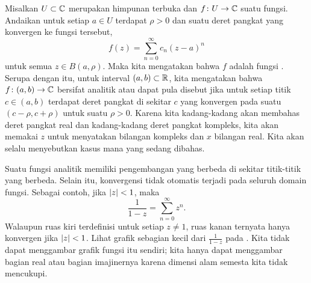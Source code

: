 Misalkan $U \subset {\mathbb{C}}$ merupakan himpunan terbuka dan
$f \colon U \to {\mathbb{C}}$ suatu fungsi.
Andaikan untuk setiap $a \in U$ terdapat $\rho > 0$ dan suatu deret
pangkat yang konvergen ke fungsi tersebut,
\begin{equation*}
f(z) = \sum_{n=0}^\infty c_n {(z-a)}^n
\end{equation*}
untuk semua $z \in B(a,\rho)$.
Maka kita mengatakan bahwa $f$ adalah fungsi \emph{}.
Serupa dengan itu, untuk interval $(a,b) \subset {\mathbb{R}}$, kita mengatakan bahwa $f \colon (a,b) \to {\mathbb{C}}$
bersifat analitik atau dapat pula disebut \emph{}
jika untuk setiap titik $c \in
(a,b)$ terdapat deret pangkat di sekitar $c$ yang konvergen pada suatu
$(c-\rho,c+\rho)$
untuk suatu $\rho > 0$.
Karena kita kadang-kadang akan membahas deret pangkat real dan kadang-kadang
deret pangkat kompleks, kita akan memakai $z$ untuk menyatakan bilangan kompleks dan $x$ bilangan real.
Kita akan selalu menyebutkan kasus mana yang sedang dibahas.

Suatu fungsi analitik memiliki pengembangan yang berbeda di sekitar titik-titik yang berbeda.
Selain itu, konvergensi tidak otomatis terjadi pada seluruh
domain fungsi.  Sebagai contoh, jika $\lvert {z} \rvert < 1$, maka
\begin{equation*}
\frac{1}{1-z} = \sum_{n=0}^\infty z^n .
\end{equation*}
Walaupun ruas kiri terdefinisi untuk setiap $z \neq 1$, ruas kanan
ternyata hanya konvergen jika $\lvert {z} \rvert < 1$.  Lihat grafik
sebagian kecil dari $\frac{1}{1-z}$ pada .
Kita tidak dapat menggambar grafik
fungsi itu sendiri; kita hanya dapat menggambar bagian real atau bagian imajinernya karena
dimensi alam semesta kita tidak mencukupi.

\begin{myfigureht}
\caption{Grafik bagian real dan bagian imajiner dari $z=x+iy \mapsto \frac{1}{1-z}$
pada persegi $[-0.8,0.8]^2$.  Singularitas di $z=1$ ditandai dengan
garis vertikal putus-putus.\label{fig:1over1mz}}
\end{myfigureht}

